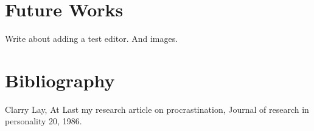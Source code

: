 \documentclass[12pt, a4paper, twoside]{article}
\begin{document}
\section{Future Works}

Write about adding a test editor. And images.

\section{Bibliography}

\begin{thebibliography}{9}

		Clarry Lay,
		At Last my research article on procrastination,
		Journal of research in personality 20,
		1986.

\end{thebibliography}
\end{document}

